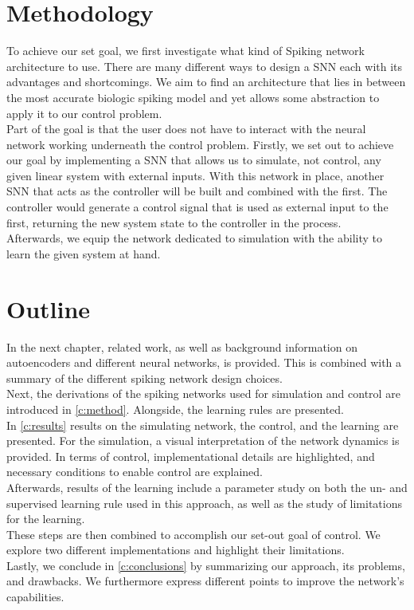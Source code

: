 \section{Methodology}
To achieve our set goal, we first investigate what kind of Spiking network architecture to use. There are many different ways to design a \ac{SNN} each with its advantages and shortcomings. We aim to find an architecture that lies in between the most accurate biologic spiking model and yet allows some abstraction to apply it to our control problem.\\
Part of the goal is that the user does not have to interact with the neural network working underneath the control problem.
Firstly, we set out to achieve our goal by implementing a \ac{SNN} that allows us to simulate, not control, any given linear system with external inputs. With this network in place, another \ac{SNN} that acts as the controller will be built and combined with the first. The controller would generate a control signal that is used as external input to the first, returning the new system state to the controller in the process.\\
Afterwards, we equip the network dedicated to simulation with the ability to learn the given system at hand.\\


\section{Outline}
In the next chapter, related work, as well as background information on autoencoders and different neural networks, is provided. This is combined with a summary of the different spiking network design choices.\\
Next, the derivations of the spiking networks used for simulation and control are introduced in \cref{c:method}. Alongside, the learning rules are presented.\\
In \cref{c:results} results on the simulating network, the control, and the learning are presented. For the simulation, a visual interpretation of the network dynamics is provided. In terms of control, implementational details are highlighted, and necessary conditions to enable control are explained.\\
Afterwards, results of the learning include a parameter study on both the un- and supervised learning rule used in this approach, as well as the study of limitations for the learning.\\
These steps are then combined to accomplish our set-out goal of control. We explore two different implementations and highlight their limitations.\\
Lastly, we conclude in \cref{c:conclusions} by summarizing our approach, its problems, and drawbacks. We furthermore express different points to improve the network's capabilities.
